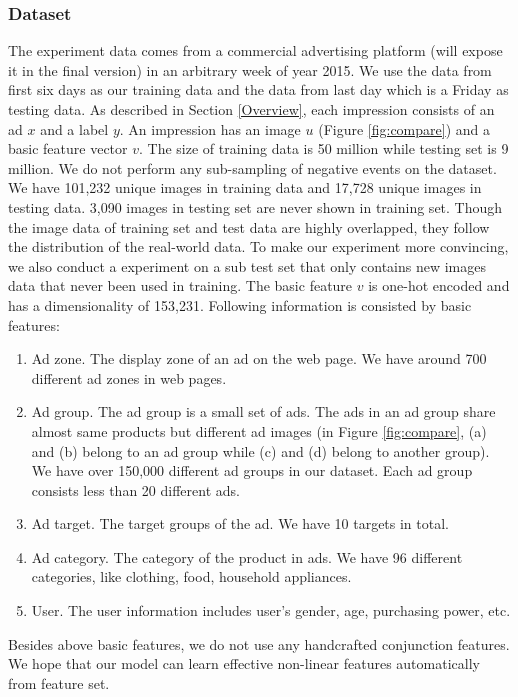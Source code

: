 \documentclass{sig-alternate}
\begin{document}
\subsubsection{Dataset}
The experiment data comes from a commercial advertising platform (will expose it in the final version) in an  arbitrary  week of year 2015. We use the data from first six days as our training data and the data from last day which is a Friday as testing data.  As described in Section \ref{Overview}, each impression consists of an ad $x$ and a label $y$.  An impression has an image $u$ (Figure \ref{fig:compare}) and a basic feature vector $v$.  The size of training data is 50 million while testing set is 9 million. We do not perform any sub-sampling of negative events on the dataset. We have 101,232 unique images in training data and 17,728 unique images in testing data. 3,090 images in testing set are never shown in training set. Though the image data of training set and test data are highly overlapped, they follow the distribution of the real-world data. To make our experiment more convincing, we also conduct a experiment on a sub test set that only contains new images data that never been used in training.  The basic feature $v$ is one-hot encoded and has a dimensionality of 153,231. Following information is consisted by basic features:
\begin{enumerate}
	\item Ad zone. The display zone of an ad on the web page. We have around 700 different ad zones in web pages.
	\item Ad group. The ad group is a small set of ads. The ads in an ad group share almost same  products but different ad images (in Figure \ref{fig:compare}, (a) and (b) belong to an ad group while (c) and (d) belong to another group). We have over 150,000 different ad groups in our dataset. Each ad group consists less than 20 different   ads.
	\item Ad target. The target groups of the ad.  We have 10 targets in total.
	\item Ad category. The category of the product in ads. We have 96 different categories, like clothing, food, household appliances. 
	\item User. The user information includes user's gender, age, purchasing power, etc. 
\end{enumerate}
Besides above basic features, we do not use any handcrafted conjunction features. We hope that  our model can learn  effective non-linear features automatically from feature set.
\end{document}
